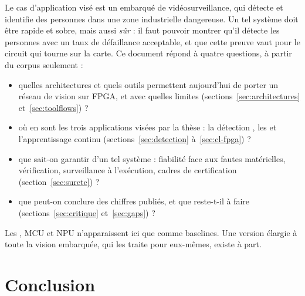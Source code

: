 \documentclass[11pt,a4paper]{article}
\begin{document}
Le cas d'application visé est un  embarqué de vidéosurveillance, qui détecte et
identifie des personnes dans une zone industrielle dangereuse. Un tel système doit être
rapide et sobre, mais aussi \emph{sûr} : il faut pouvoir montrer qu'il détecte les
personnes avec un taux de défaillance acceptable, et que cette preuve vaut pour le circuit
qui tourne sur la carte. Ce document répond à quatre questions, à partir du corpus
seulement :
\begin{itemize}
  \item quelles architectures et quels outils permettent aujourd'hui de porter un réseau de
    vision sur FPGA, et avec quelles limites (sections~\ref{sec:architectures}
    et~\ref{sec:toolflows}) ?
  \item où en sont les trois applications visées par la thèse : la détection , les
     et l'apprentissage continu (sections~\ref{sec:detection}
    à~\ref{sec:cl-fpga}) ?
  \item que sait-on garantir d'un tel système : fiabilité face aux fautes matérielles,
    vérification, surveillance à l'exécution, cadres de certification
    (section~\ref{sec:surete}) ?
  \item que peut-on conclure des chiffres publiés, et que reste-t-il à faire
    (sections~\ref{sec:critique} et~\ref{sec:gaps}) ?
\end{itemize}
Les , MCU et NPU n'apparaissent ici que comme baselines. Une version élargie à toute
la vision embarquée, qui les traite pour eux-mêmes, existe à part.











\section{Conclusion}
\end{document}
